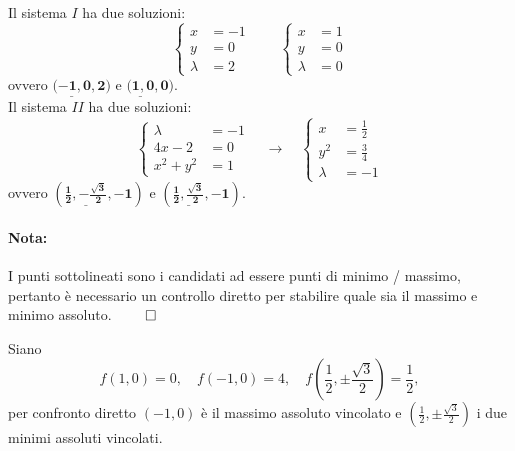 Il sistema $I$ ha due soluzioni:
\begin{equation*}
	\begin{cases}
		x &= -1\\
		y &= 0\\
		\lambda &= 2
	\end{cases}\qquad
	\begin{cases}
		x &= 1\\
		y &=0\\
		\lambda &=0
	\end{cases}
\end{equation*}
ovvero $\boldsymbol{\underline{(-1, 0}, 2)}$ e $\boldsymbol{\underline{(1,0},0)}$.\\
Il sistema $II$ ha due soluzioni:
\begin{equation*}
	\begin{cases}
		\lambda &= -1\\
		4 x - 2 &= 0\\
		x^2 + y^2 &= 1
	\end{cases}\quad\rightarrow\quad
	\begin{cases}
		x &= \frac{1}{2}\\
		y^2 &= \frac{3}{4}\\
		\lambda &=-1
	\end{cases}
\end{equation*}
ovvero $\boldsymbol{\left(\underline{\frac{1}{2}, -\frac{\sqrt{3}}{2}}, -1\right)}$ e $\boldsymbol{\left(\underline{\frac{1}{2}, \frac{\sqrt{3}}{2}}, -1\right)}$.

\paragraph{Nota:} I punti sottolineati sono i candidati ad essere punti di minimo / massimo, pertanto è necessario un controllo diretto per stabilire quale sia il massimo e minimo assoluto. $\qed$

Siano
\begin{equation*}
	f(1,0) = 0, \quad f(-1,0) = 4,\quad f\left(\frac{1}{2},\pm\frac{\sqrt{3}}{2}\right) = \frac{1}{2},
\end{equation*}
per confronto diretto $(-1, 0)$ è il massimo assoluto vincolato e $\left(\frac{1}{2},\pm\frac{\sqrt{3}}{2}\right)$ i due minimi assoluti vincolati.

